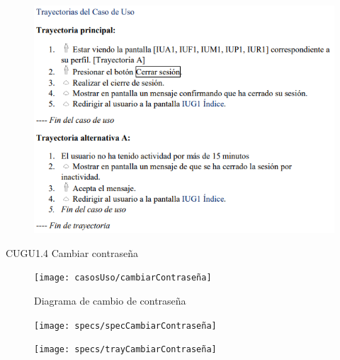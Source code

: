 \documentclass[12pt,letterpaper]{article}
\begin{document}
            \begin{figure}[H]
                \centering
                \includegraphics [scale=0.9]{specs/trayCerrarSesion}
            \end{figure}

            \newpage
            CUGU1.4 Cambiar contraseña 
            \begin{figure}[H]
                \centering
                \texttt{[image: casosUso/cambiarContraseña]}
                \caption{Diagrama de cambio de contraseña}
            \end{figure}
            \begin{figure}[H]
                \centering
                \texttt{[image: specs/specCambiarContraseña]}
            \end{figure}
            \begin{figure}[H]
                \centering
                \texttt{[image: specs/trayCambiarContraseña]}
            \end{figure}
\end{document}
